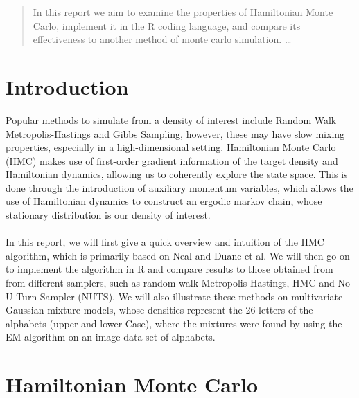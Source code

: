 \documentclass[11pt]{article}
\begin{document}
\maketitle

\begin{abstract}
In this report we aim to examine the properties of Hamiltonian Monte Carlo, implement it in the R coding language, and compare its effectiveness to another method of monte carlo simulation. \ldots
\end{abstract}
\newpage
\section{Introduction}
Popular methods to simulate from a density of interest include Random Walk Metropolis-Hastings and Gibbs Sampling, however, these may have slow mixing properties, especially in a high-dimensional setting. Hamiltonian Monte Carlo (HMC) makes use of first-order gradient information of the target density and Hamiltonian dynamics, allowing us to coherently explore the state space. This is done through the introduction of auxiliary momentum variables, which allows the use of Hamiltonian dynamics to construct an ergodic markov chain, whose stationary distribution is our density of interest. 
\\
\\
In this report, we will first give a quick overview and intuition of the HMC algorithm, which is primarily based on Neal\cite{neal} and Duane et al\cite{duane}. We will then go on to implement the algorithm in R and compare results to those obtained from from different samplers, such as random walk Metropolis Hastings, HMC and No-U-Turn Sampler (NUTS). We will also illustrate these methods on multivariate Gaussian mixture models, whose densities represent the 26 letters of the alphabets (upper and lower Case), where the mixtures were found by using the EM-algorithm on an image data set of alphabets.
\section{Hamiltonian Monte Carlo}
\end{document}
